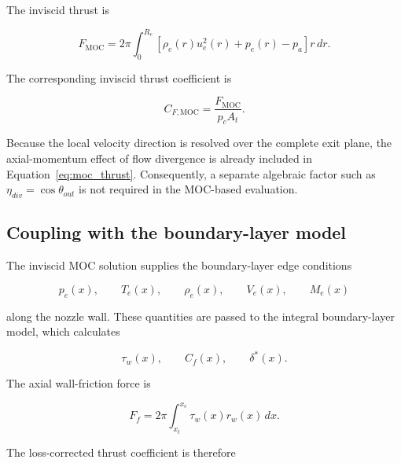 The inviscid thrust is

\begin{equation}
    \boxed{
    F_{\mathrm{MOC}}
    =
    2\pi
    \int_0^{R_e}
    \left[
        \rho_e(r)u_e^2(r)
        +
        p_e(r)-p_a
    \right]r\,dr
    }.
    \label{eq:moc_thrust}
\end{equation}

The corresponding inviscid thrust coefficient is

\begin{equation}
    \boxed{
    C_{F,\mathrm{MOC}}
    =
    \frac{F_{\mathrm{MOC}}}{p_cA_t}
    }.
    \label{eq:moc_thrust_coefficient}
\end{equation}

Because the local velocity direction is resolved over the complete exit
plane, the axial-momentum effect of flow divergence is already included
in Equation~\eqref{eq:moc_thrust}. Consequently, a separate algebraic
factor such as $\eta_{div}=\cos\theta_{out}$ is not required in the
MOC-based evaluation.

\subsection{Coupling with the boundary-layer model}

The inviscid MOC solution supplies the boundary-layer edge conditions

\begin{equation}
    p_e(x),\qquad
    T_e(x),\qquad
    \rho_e(x),\qquad
    V_e(x),\qquad
    M_e(x)
\end{equation}

along the nozzle wall. These quantities are passed to the integral
boundary-layer model, which calculates

\begin{equation}
    \tau_w(x),\qquad
    C_f(x),\qquad
    \delta^*(x).
\end{equation}

The axial wall-friction force is

\begin{equation}
    \boxed{
    F_f
    =
    2\pi
    \int_{x_t}^{x_e}
    \tau_w(x)r_w(x)\,dx
    }.
    \label{eq:moc_wall_friction}
\end{equation}

The loss-corrected thrust coefficient is therefore

